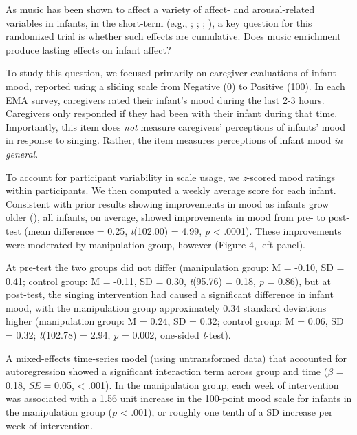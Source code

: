 \documentclass[
]{article}
\begin{document}
As music has been shown to affect a variety of affect- and
arousal-related variables in infants, in the short-term (e.g.,
;
;
;
), a key question for
this randomized trial is whether such effects are cumulative. Does music
enrichment produce lasting effects on infant affect?

To study this question, we focused primarily on caregiver evaluations of
infant mood, reported using a sliding scale from Negative (0) to
Positive (100). In each EMA survey, caregivers rated their infant's mood
during the last 2-3 hours. Caregivers only responded if they had been
with their infant during that time. Importantly, this item does
\emph{not} measure caregivers' perceptions of infants' mood in response
to singing. Rather, the item measures perceptions of infant mood
\emph{in general}.

To account for participant variability in scale usage, we
\emph{z}-scored mood ratings within participants. We then computed a
weekly average score for each infant. Consistent with prior results
showing improvements in mood as infants grow older
(), all infants, on average, showed
improvements in mood from pre- to post-test (mean difference = 0.25,
\emph{t}(102.00) = 4.99, \emph{p} \textless{} .0001). These improvements
were moderated by manipulation group, however (Figure 4, left panel).

At pre-test the two groups did not differ (manipulation group: M =
-0.10, SD = 0.41; control group: M = -0.11, SD = 0.30, \emph{t}(95.76) =
0.18, \emph{p} = 0.86), but at post-test, the singing intervention had
caused a significant difference in infant mood, with the manipulation
group approximately 0.34 standard deviations higher (manipulation group:
M = 0.24, SD = 0.32; control group: M = 0.06, SD = 0.32;
\emph{t}(102.78) = 2.94, \emph{p} = 0.002, one-sided \emph{t}-test).

A mixed-effects time-series model (using untransformed data) that
accounted for autoregression showed a significant interaction term
across group and time (\(\beta\) = 0.18, \emph{SE} = 0.05, \textless{}
.001). In the manipulation group, each week of intervention was
associated with a 1.56 unit increase in the 100-point mood scale for
infants in the manipulation group (\emph{p} \textless{} .001), or
roughly one tenth of a SD increase per week of intervention.
\end{document}
